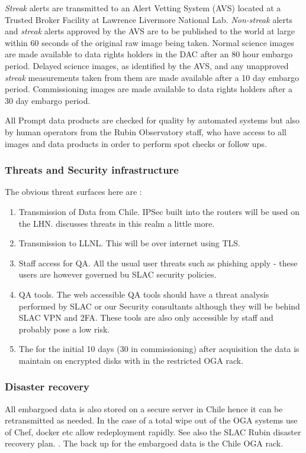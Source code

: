 \emph{Streak} alerts are transmitted to an \gls{Alert} Vetting System (AVS) located at a Trusted Broker Facility at  Lawrence Livermore National Lab.
\emph{Non-streak} alerts and \emph{streak} alerts approved by the \gls{AVS} are to be published to the world at large within 60 seconds of the original raw image being taken.
Normal science images are made available to data rights holders in the \gls{DAC} after an 80 hour embargo period.
Delayed science images, as identified by the \gls{AVS}, and any unapproved \emph{streak} measurements taken from them are made available after a 10 day embargo period. Commissioning images are made available to data rights holders after a 30 day embargo period.

All Prompt data products are checked for quality by automated systems but also by human operators from the Rubin Observatory staff, who have access to all images and data products in order to perform spot checks or follow ups.

\subsubsection{ Threats and Security infrastructure}
The obvious threat surfaces here are :
\begin{enumerate}
\item Transmission of Data from Chile. IPSec built into the routers will be used on the \gls{LHN}.  discusses threats in this realm a little more.
\item Transmission to \gls{LLNL}.  This will be over internet using TLS.
\item Staff access for \gls{QA}. All the usual user threats such as phishing apply - these users are however governed bu SLAC security policies. 
\item QA tools. The web accessible QA tools should have a threat analysis performed by SLAC or our Security consultants although they will be behind SLAC \gls{VPN} and 2FA. These tools are also only accessible by staff and probably pose a low risk.
\item The for the initial 10 days (30 in commissioning) after acquisition the data is maintain on encrypted disks with in the restricted \gls{OGA} rack.
\end{enumerate}

\subsubsection{Disaster recovery}
All embargoed data is also stored on a secure server in Chile hence it can be retransmitted as needed.
In the case of a total wipe out of the \gls{OGA} systems use of Chef, docker etc allow redeployment rapidly.
See also the \gls{SLAC} Rubin disaster recovery plan. .
The back up for the embargoed data is the Chile OGA rack.

